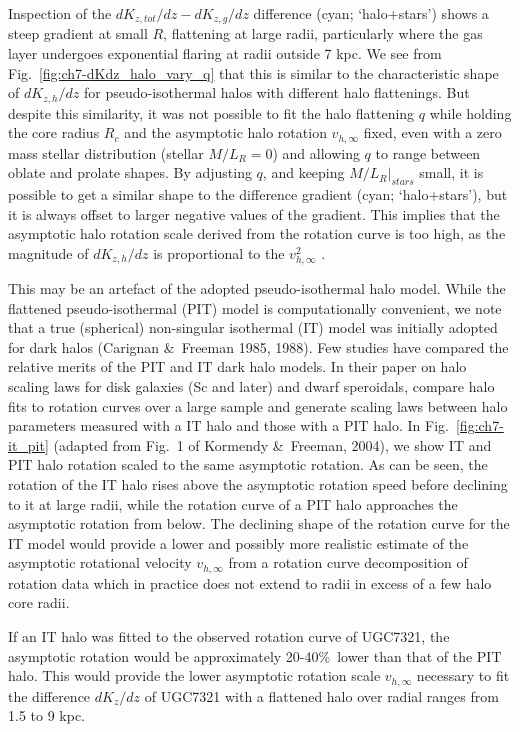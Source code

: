 \documentclass[traditabstract]{aa} %
\begin{document}
Inspection of the $dK_{z,tot}/dz - dK_{z,g}/dz$ difference (cyan; `halo+stars')
shows a steep gradient at small $R$, flattening at large radii,
particularly where the gas layer undergoes exponential flaring at
radii outside 7 kpc.  We see from
Fig.~\ref{fig:ch7-dKdz_halo_vary_q} that this is similar to the
characteristic shape of $dK_{z,h}/dz$ for pseudo-isothermal halos with
different halo flattenings. But despite this similarity, it was
not possible to fit the halo flattening $q$ while holding the core
radius $R_c$ and the asymptotic halo rotation $v_{h,\infty}$ fixed,
even with a zero mass stellar distribution (stellar $M/L_R=0$) and
allowing $q$ to range between oblate and prolate shapes. By adjusting
$q$, and keeping $M/L_R|_{stars}$ small, it is possible to get a similar
shape to the difference gradient (cyan; `halo+stars'), 
but it is always offset to
larger negative values of the gradient. This implies that the
asymptotic halo rotation scale derived from the rotation curve is too
high, as the magnitude of $dK_{z,h}/dz$ is proportional to the
$v_{h,\infty}^2$ \citep[see ][]{srjf1994}. 



This may be an artefact of the adopted pseudo-isothermal halo model.
While the flattened pseudo-isothermal (PIT) model is computationally
convenient, we note that a true (spherical) non-singular isothermal
(IT) model was initially adopted for dark halos 
(Carignan \&\ Freeman 1985, 1988).
Few studies have compared the relative merits of the PIT and IT
dark halo models. In their paper on halo scaling laws for disk
galaxies (Sc and later) and dwarf speroidals, \citet{kf2004} compare
halo fits to rotation curves over a large sample and generate scaling
laws between halo parameters measured with a IT halo and those with
a PIT halo. In Fig.~\ref{fig:ch7-it_pit} (adapted from Fig.~1 of
Kormendy \&\ Freeman, 2004), we show IT and PIT halo rotation scaled
to the same asymptotic rotation. As can be seen, the rotation of
the IT halo rises above the asymptotic rotation speed before declining
to it at large radii, while the rotation curve of a PIT halo
approaches the asymptotic rotation from below. The declining shape
of the rotation curve for the IT model would provide a lower and
possibly more realistic estimate of the asymptotic rotational
velocity $v_{h,\infty}$ from a rotation curve decomposition of
rotation data which in practice does not extend to radii in excess
of a few halo core radii.

If an IT halo was fitted to the observed rotation curve
of UGC7321, the asymptotic rotation would be approximately 20-40\%\
lower than that of the PIT halo. This would provide the lower
asymptotic rotation scale $v_{h,\infty}$ necessary to fit the
difference $dK_z/dz$ of UGC7321 with a flattened halo over radial
ranges from 1.5 to 9 kpc.
\end{document}
